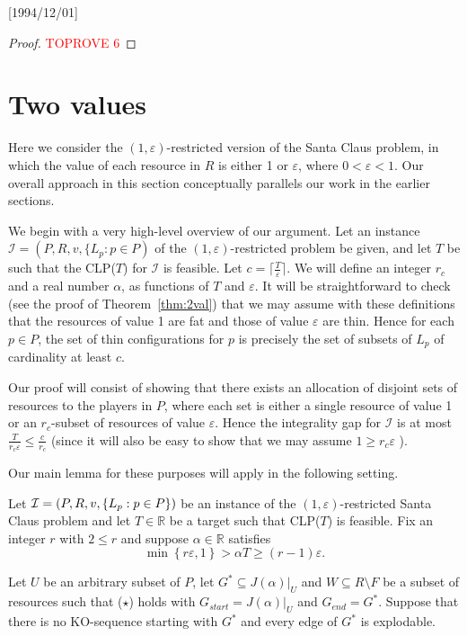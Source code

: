 \NeedsTeXFormat{LaTeX2e}[1994/12/01]\documentclass[letterpaper, 11pt]{article}
\theoremstyle{definition}
\theoremstyle{remark}
\numberwithin{equation}{section}
\newcommand{\cI}{\mathcal{I}}
\newcommand{\veps}{\varepsilon}
\begin{document}
  \begin{proof}\textcolor{red}{TOPROVE 6}\end{proof}

\section{Two values}\label{sec:2val}

Here we consider the $(1,\varepsilon)$-restricted version
of the Santa Claus problem, in which the value of each resource in $R$ is either 1 or $\veps$, where $0<\varepsilon<1$. Our overall approach in this section conceptually
parallels our work in the earlier sections.

We begin with a very high-level overview of our argument. Let
  an instance $\cI=(P,R,v,\{L_p:p\in P)$ of the
  $(1,\varepsilon)$-restricted problem be 
  given, and let $T$ be such that the CLP($T$) for $\cI$ is
  feasible. Let $c=\lceil\frac{T}{\veps} \rceil$. We will define an
  integer $r_c$ and a real number $\alpha$, as functions of $T$ and $\veps$.
  It will be
  straightforward to check (see the proof of Theorem~\ref{thm:2val})
  that we may assume with these definitions that the resources of
  value 1 are fat and those of value $\veps$ are thin. Hence for each
  $p\in P$, the set of thin configurations for $p$ is precisely the
  set of subsets of $L_p$ of cardinality at least $c$.

  Our proof will consist of showing that there exists an allocation
  of disjoint sets of resources to the players in $P$, where each
  set is either a single resource of value 1 or an $r_c$-subset of
  resources of value $\veps$. Hence the integrality gap for $\cI$ is
  at most $\frac{T}{r_c\veps}\leq\frac{c}{r_c}$ (since it will also be easy to show that we may assume   $1\geq r_c\veps$ ).

Our main lemma for these purposes will apply in the following setting.

\medskip

Let ${\cal I} = (P, R , v, \{L_p : p\in P\})$ be an instance of the
$(1,\veps)$-restricted Santa Claus problem and let $T\in \mathbb{R}$
be a target such that 
CLP($T$) is feasible. Fix an integer $r$ with $2\leq r$
and suppose $\alpha\in \mathbb{R}$ satisfies $$\min\left\{r\veps, 1 \right\}  > \alpha T \geq (r-1)\veps.$$ 

Let $U$ be an arbitrary subset of $P$, let $G^* \subseteq J(\alpha)|_U$ and  $W\subseteq R \setminus F$ be a subset of resources such
that ($\star$) holds with $G_{start}=J(\alpha)|_U$ and
$G_{end}=G^*$. Suppose that there is no KO-sequence starting with $G^*$ and every edge of $G^*$ is explodable.
\end{document}
